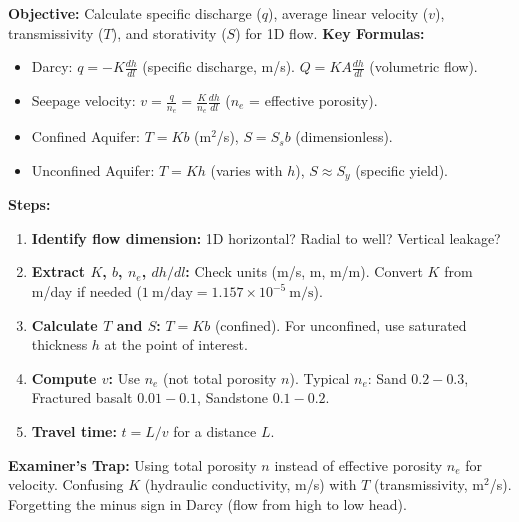 \documentclass[11pt]{article}
\begin{document}
\begin{methode}
\textbf{Objective:} Calculate specific discharge ($q$), average linear velocity ($v$), transmissivity ($T$), and storativity ($S$) for 1D flow.
\textbf{Key Formulas:}
\begin{itemize}
    \item Darcy: $q = -K \frac{dh}{dl}$ (specific discharge, m/s). $Q = K A \frac{dh}{dl}$ (volumetric flow).
    \item Seepage velocity: $v = \frac{q}{n_e} = \frac{K}{n_e} \frac{dh}{dl}$ ($n_e$ = effective porosity).
    \item Confined Aquifer: $T = K b$ (m$^2$/s), $S = S_s b$ (dimensionless).
    \item Unconfined Aquifer: $T = K h$ (varies with $h$), $S \approx S_y$ (specific yield).
\end{itemize}
\textbf{Steps:}
\begin{enumerate}
    \item \textbf{Identify flow dimension:} 1D horizontal? Radial to well? Vertical leakage?
    \item \textbf{Extract $K$, $b$, $n_e$, $dh/dl$:} Check units (m/s, m, m/m). Convert $K$ from m/day if needed ($1\ \mathrm{m/day} = 1.157 \times 10^{-5}\ \mathrm{m/s}$).
    \item \textbf{Calculate $T$ and $S$:} $T = Kb$ (confined). For unconfined, use saturated thickness $h$ at the point of interest.
    \item \textbf{Compute $v$:} Use $n_e$ (not total porosity $n$). Typical $n_e$: Sand $0.2-0.3$, Fractured basalt $0.01-0.1$, Sandstone $0.1-0.2$.
    \item \textbf{Travel time:} $t = L / v$ for a distance $L$.
\end{enumerate}
\textbf{Examiner's Trap:} Using total porosity $n$ instead of effective porosity $n_e$ for velocity. Confusing $K$ (hydraulic conductivity, m/s) with $T$ (transmissivity, m$^2$/s). Forgetting the minus sign in Darcy (flow from high to low head).
\end{methode}
\end{document}
